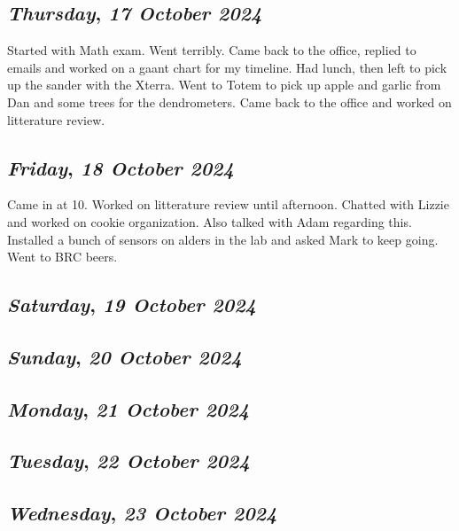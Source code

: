 \def\day{\textit{17 October 2024}}
\def\weekday{\textit{Thursday}}
\subsection*{\weekday, \day}
Started with Math exam. Went terribly. Came back to the office, replied to emails and worked on a gaant chart for my timeline. Had lunch, then left to pick up the sander with the Xterra. Went to Totem to pick up apple and garlic from Dan and some trees for the dendrometers. Came back to the office and worked on litterature review. 

\def\day{\textit{18 October 2024}}
\def\weekday{\textit{Friday}}
\subsection*{\weekday, \day}
Came in at 10. Worked on litterature review until afternoon. Chatted with Lizzie and worked on cookie organization. Also talked with Adam regarding this. Installed a bunch of sensors on alders in the lab and asked Mark to keep going. Went to BRC beers. 
\def\day{\textit{19 October 2024}}
\def\weekday{\textit{Saturday}}
\subsection*{\weekday, \day}

\def\day{\textit{20 October 2024}}
\def\weekday{\textit{Sunday}}
\subsection*{\weekday, \day}

\def\day{\textit{21 October 2024}}
\def\weekday{\textit{Monday}}
\subsection*{\weekday, \day}

\def\day{\textit{22 October 2024}}
\def\weekday{\textit{Tuesday}}
\subsection*{\weekday, \day}

\def\day{\textit{23 October 2024}}
\def\weekday{\textit{Wednesday}}
\subsection*{\weekday, \day}

